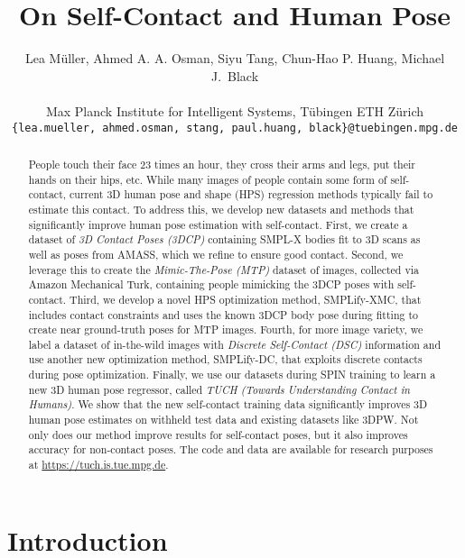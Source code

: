 \documentclass[final]{cvpr}
\newcommand{\smplifyxmc}{\mbox{SMPLify-XMC}\xspace}
\newcommand{\smplifyxdc}{\mbox{SMPLify-DC}\xspace}
\theoremstyle{definition}
\begin{document}
	
\title{On Self-Contact and Human Pose}
	\author{Lea M\"uller, Ahmed A. A. Osman, Siyu Tang, Chun-Hao P. Huang, Michael J.~Black\\
		\\
		Max Planck Institute for Intelligent Systems, T\"ubingen \hspace{0.25in} ETH Z\"urich\\
		{\tt\small \{lea.mueller,  ahmed.osman, stang, paul.huang, black\}@tuebingen.mpg.de}
	}
		
	\maketitle
	
	
\begin{abstract}
People touch their face 23 times an hour, they cross their arms and legs, put their hands on their hips, etc.  
While many images of people contain some form of self-contact, current 3D human pose and shape (HPS) regression methods typically fail to estimate this contact.
To address this, we develop new datasets and methods that significantly improve human pose estimation with self-contact.
First, we create a dataset of {\em 3D Contact Poses (3DCP)} containing SMPL-X bodies fit to 3D scans as well as poses from AMASS, which we refine to ensure good contact.
Second, we leverage this to create the {\em Mimic-The-Pose (MTP)} dataset of images, collected via Amazon Mechanical Turk, containing people mimicking the 3DCP poses with self-contact.
Third, we develop a novel HPS optimization method, \smplifyxmc, 
that includes contact constraints and uses the known 3DCP body pose during fitting to create near ground-truth poses for MTP images. 
Fourth, for more image variety, we label a dataset of in-the-wild images with {\em Discrete Self-Contact (DSC)} information and use another new optimization method, \smplifyxdc, that exploits discrete contacts during pose optimization.
Finally, we use our datasets during SPIN training to learn a new 3D human pose regressor, called {\em TUCH (Towards
Understanding Contact in Humans)}.
We show that the new self-contact training data significantly improves 3D human pose estimates on withheld test data and existing datasets like 3DPW.  Not only does our method improve results for self-contact poses, but it also improves accuracy for non-contact poses.
The code and data are available for research purposes at \url{https://tuch.is.tue.mpg.de}.

\end{abstract} 	
\section{Introduction}
\end{document}
